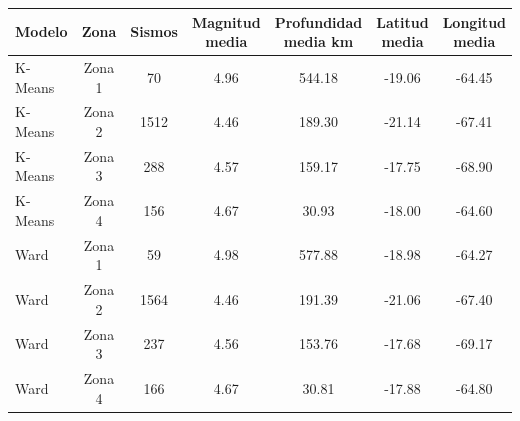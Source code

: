 \begin{tabular}{lcccccc}
\toprule
Modelo & Zona & Sismos & Magnitud media & Profundidad media km & Latitud media & Longitud media \\
\midrule
K-Means & Zona 1 & 70 & 4.96 & 544.18 & -19.06 & -64.45 \\
K-Means & Zona 2 & 1512 & 4.46 & 189.30 & -21.14 & -67.41 \\
K-Means & Zona 3 & 288 & 4.57 & 159.17 & -17.75 & -68.90 \\
K-Means & Zona 4 & 156 & 4.67 & 30.93 & -18.00 & -64.60 \\
Ward & Zona 1 & 59 & 4.98 & 577.88 & -18.98 & -64.27 \\
Ward & Zona 2 & 1564 & 4.46 & 191.39 & -21.06 & -67.40 \\
Ward & Zona 3 & 237 & 4.56 & 153.76 & -17.68 & -69.17 \\
Ward & Zona 4 & 166 & 4.67 & 30.81 & -17.88 & -64.80 \\
\bottomrule
\end{tabular}
